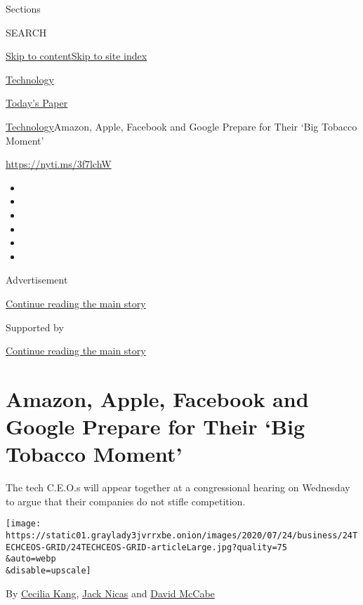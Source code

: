 Sections

SEARCH

\protect\hyperlink{site-content}{Skip to
content}\protect\hyperlink{site-index}{Skip to site index}

\href{https://www.nytimes3xbfgragh.onion/section/technology}{Technology}

\href{https://myaccount.nytimes3xbfgragh.onion/auth/login?response_type=cookie\&client_id=vi}{}

\href{https://www.nytimes3xbfgragh.onion/section/todayspaper}{Today's
Paper}

\href{/section/technology}{Technology}\textbar{}Amazon, Apple, Facebook
and Google Prepare for Their `Big Tobacco Moment'

\href{https://nyti.ms/3f7lchW}{https://nyti.ms/3f7lchW}

\begin{itemize}
\item
\item
\item
\item
\item
\item
\end{itemize}

Advertisement

\protect\hyperlink{after-top}{Continue reading the main story}

Supported by

\protect\hyperlink{after-sponsor}{Continue reading the main story}

\hypertarget{amazon-apple-facebook-and-google-prepare-for-their-big-tobacco-moment}{%
\section{Amazon, Apple, Facebook and Google Prepare for Their `Big
Tobacco
Moment'}\label{amazon-apple-facebook-and-google-prepare-for-their-big-tobacco-moment}}

The tech C.E.O.s will appear together at a congressional hearing on
Wednesday to argue that their companies do not stifle competition.

\texttt{[image: https://static01.graylady3jvrrxbe.onion/images/2020/07/24/business/24TECHCEOS-GRID/24TECHCEOS-GRID-articleLarge.jpg?quality=75\\\&auto=webp\\\&disable=upscale]}

By \href{https://www.nytimes3xbfgragh.onion/by/cecilia-kang}{Cecilia
Kang}, \href{https://www.nytimes3xbfgragh.onion/by/jack-nicas}{Jack
Nicas} and
\href{https://www.nytimes3xbfgragh.onion/by/david-mccabe}{David McCabe}


